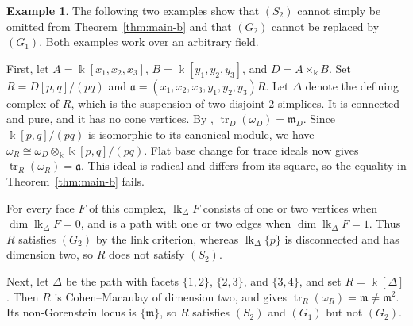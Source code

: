 \documentclass[a4paper,11pt]{amsart}
\theoremstyle{plain}
\theoremstyle{definition}
\newtheorem{example}[theorem]{Example}
\theoremstyle{remark}
\DeclareMathOperator{\tr}{tr}
\newcommand{\kk}{\Bbbk}
\newcommand{\mm}{\mathfrak m}
\begin{document}
\begin{example}\label{ex:square-hypotheses}
The following two examples show that $(S_2)$ cannot simply be omitted from Theorem~\ref{thm:main-b} and that $(G_2)$ cannot be replaced by $(G_1)$. Both examples work over an arbitrary field.

First, let $A=\kk[x_1,x_2,x_3]$, $B=\kk[y_1,y_2,y_3]$, and $D=A\times_\kk B$. Set $R=D[p,q]/(pq)$ and $\mathfrak a=(x_1,x_2,x_3,y_1,y_2,y_3)R$. Let $\Delta$ denote the defining complex of $R$, which is the suspension of two disjoint $2$-simplices. It is connected and pure, and it has no cone vertices. By \cite[Theorem~3.11]{KM26}, $\tr_D(\omega_D)=\mathfrak m_D$. Since $\kk[p,q]/(pq)$ is isomorphic to its canonical module, we have $\omega_R\cong\omega_D\otimes_\kk\kk[p,q]/(pq)$. Flat base change for trace ideals now gives $\tr_R(\omega_R)=\mathfrak a$. This ideal is radical and differs from its square, so the equality in Theorem~\ref{thm:main-b} fails.

For every face $F$ of this complex, $\operatorname{lk}_\Delta F$ consists of one or two vertices when $\dim\operatorname{lk}_\Delta F=0$, and is a path with one or two edges when $\dim\operatorname{lk}_\Delta F=1$. Thus $R$ satisfies $(G_2)$ by the link criterion, whereas $\operatorname{lk}_\Delta\{p\}$ is disconnected and has dimension two, so $R$ does not satisfy $(S_2)$.

Next, let $\Delta$ be the path with facets $\{1,2\}$, $\{2,3\}$, and $\{3,4\}$, and set $R=\kk[\Delta]$. Then $R$ is Cohen--Macaulay of dimension two, and \cite[Theorem~A]{MV} gives $\tr_R(\omega_R)=\mm\ne\mm^2$. Its non-Gorenstein locus is $\{\mm\}$, so $R$ satisfies $(S_2)$ and $(G_1)$ but not $(G_2)$.
\end{example}
\end{document}

